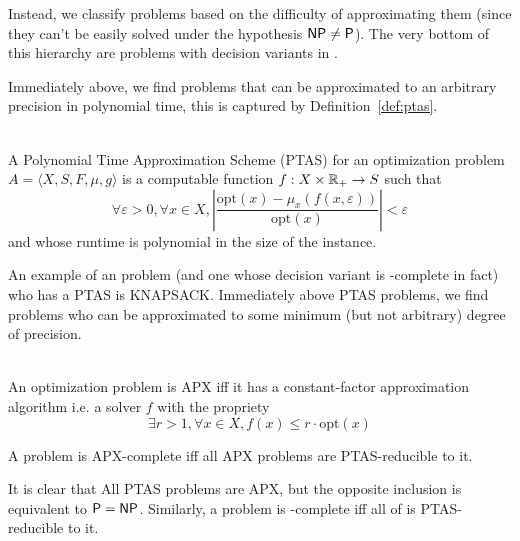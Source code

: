     Instead, we classify \classNPO{} problems based on the difficulty of approximating them (since they can't be easily solved under the hypothesis \(\textsf{NP}\neq\textsf{P}\)). The very bottom of this hierarchy are problems with decision variants in \classP.

    Immediately above, we find problems that can be approximated to an arbitrary precision in polynomial time, this is captured by Definition~\ref{def:ptas}.

    \begin{definition}[PTAS]\ \\
        \label{def:ptas}
        A Polynomial Time Approximation Scheme (PTAS) for an optimization problem \(A=\langle X, S, F, \mu, g\rangle\) is a computable function \(f:X\times \mathbb{R}_+ \rightarrow S\) such that
        \[\forall\varepsilon>0, \forall x\in X, \left|\frac{\mathrm{opt}(x) - \mu_x(f(x,\varepsilon))}{\mathrm{opt}(x)}\right| < \varepsilon\]
        and whose runtime is polynomial in the size of the instance.
    \end{definition}

    An example of an \classNPO{} problem (and one whose decision variant is \classNP-complete in fact) who has a PTAS is \textsf{KNAPSACK}. Immediately above PTAS problems, we find problems who can be approximated to some minimum (but not arbitrary) degree of precision. 
    \newcommand{\classAPX}{\textsf{APX}}
    \begin{definition}[APX]\ \\
        \label{def:apx}
        An optimization problem is \classAPX{} iff it has a constant-factor approximation algorithm i.e. a solver \(f\) with the propriety
        \[\exists r>1, \forall x\in X, f(x) \le r\cdot \mathrm{opt}(x) \]

        A problem is \classAPX-complete iff all \classAPX{} problems are PTAS-reducible to it.
    \end{definition}

    It is clear that All PTAS problems are \classAPX{}, but the opposite inclusion is equivalent to \(\textsf{P} = \textsf{NP}\). Similarly, a problem is \classNPO-complete iff all of \classNPO{} is PTAS-reducible to it.

